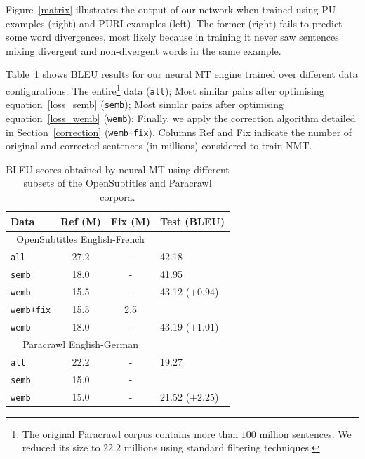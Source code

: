 \documentclass[11pt,a4paper]{article}
\begin{document}
Figure~\ref{matrix} illustrates the output of our network when trained using PU examples (right) and PURI examples (left).  
The former (right) fails to predict some word divergences, most likely because in training it never saw sentences mixing divergent and non-divergent words in the same example. 

Table~\ref{results} shows BLEU results for our neural MT engine trained over different data configurations:
The entire\footnote{The original Paracrawl corpus contains more than $100$ million sentences. We reduced its size to $22.2$ millions using standard filtering techniques.} data (\texttt{all}); 
Most similar pairs after optimising equation~\ref{loss_semb} (\texttt{semb}); 
Most similar pairs after optimising equation~\ref{loss_wemb} (\texttt{wemb}); 
Finally, we apply the correction algorithm detailed in Section~\ref{correction} (\texttt{wemb+fix}).
Columns Ref and Fix indicate the number of original and corrected sentences (in millions) considered to train NMT.

\begin{table}[h!]
\small
\center
\begin{tabular}{lccl}
\hline
\bf Data & \bf Ref (M) & \bf Fix (M) & \bf Test (BLEU) \\ %
\hline
\multicolumn{3}{c}{\scriptsize{OpenSubtitles English-French}} \\
\texttt{all}                  & 27.2 & - & 42.18 \\
\texttt{semb}            & 18.0 & - & 41.95\\
\texttt{wemb}           & 15.5 & - & 43.12  ($+0.94$)\\
\texttt{wemb+fix}   & 15.5 & 2.5 & \\
\texttt{wemb}           & 18.0 & - & 43.19  ($+1.01$)\\
\hline
\multicolumn{3}{c}{\scriptsize{Paracrawl English-German}} \\
\texttt{all}                  & 22.2 & - & 19.27 \\ 
\texttt{semb}            & 15.0 & - & \\
\texttt{wemb}           & 15.0 & - & 21.52 ($+2.25$)\\
\hline
\end{tabular}
\caption{BLEU scores obtained by neural MT using different subsets of the OpenSubtitles and Paracrawl corpora.}
\label{results}
\end{table}
\end{document}

